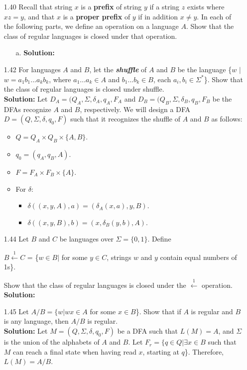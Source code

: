 \begin{enumerate}
\item[1.40]Recall that string $x$ is a \textbf{prefix} of string $y$ if a string $z$ exists where $xz = y$, and that $x$ is a \textbf{proper prefix} of $y$ if in addition $x \ne y$. In each of the following parts, we define an operation on a language $A$. Show that the class of regular languages is closed under that operation.
\begin{enumerate}
\item[a.]\textbf{Solution:} \alreadyanswered
\end{enumerate}

\item[1.42]For languages $A$ and $B$, let the \emph{\textbf{shuffle}} of $A$ and $B$ be the language \{$w$ $|$ $w=a_1b_1...a_kb_k$, where $a_1...a_k \in A$ and $b_1...b_k \in B$, each $a_i,b_i \in \Sigma^*$\}. Show that the class of regular languages is closed under shuffle.
\\
\textbf{Solution:} Let $D_A = (Q_A, \Sigma, \delta_A, q_A, F_A$ and $D_B = (Q_B, \Sigma, \delta_B, q_B, F_B$ be the DFAs recognize $A$ and $B$, respectively. We will design a DFA $D = (Q, \Sigma, \delta, q_0, F)$ such that it recognizes the shuffle of $A$ and $B$ as follows:
\begin{itemize}
\item $Q = Q_A \times Q_B \times \{A, B\}$.
\item $q_0 = (q_A, q_B, A)$.
\item $F = F_A \times F_B \times \{A\}$.
\item For $\delta$:
\begin{itemize}
\item $\delta((x, y, A), a) = (\delta_A(x, a), y, B)$.
\item $\delta((x, y, B), b) = (x, \delta_B(y, b), A)$.
\end{itemize}
\end{itemize}

\item[1.44]Let $B$ and $C$ be languages over $\Sigma = \{0, 1\}$. Define
\begin{center}
$B \xleftarrow{1} C$ = \{$w \in B |$ for some $y \in C$, strings $w$ and $y$ contain equal numbers of 1s\}. 
\end{center}
Show that the class of regular languages is closed under the $\xleftarrow{1}$ operation.
\\
\textbf{Solution:} \alreadyanswered

\item[1.45]Let $A/B = \{w | wx \in A$ for some $x \in B$\}. Show that if $A$ is regular and $B$ is any language, then $A/B$ is regular.
\\
\textbf{Solution:} Let $M = (Q, \Sigma, \delta, q_0, F)$ be a DFA such that $L(M) = A$, and $\Sigma$ is the union of the alphabets of $A$ and $B$. Let $F_{r} = \{q \in Q | \exists x \in B$ such that $M$ can reach a final state when having read $x$, starting at $q$\}. Therefore, $L(M) = A/B$. 


\end{enumerate}
